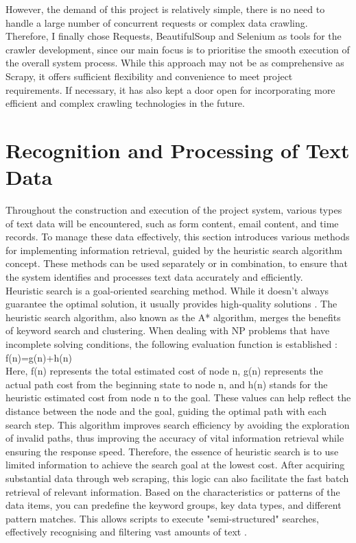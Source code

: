 \documentclass[ oneside,%
                    author={Cassie Qing Tang},
                    degree={BSc},
                     title={An Automated Response System for Disrupting Online Pet Scamming \\ },
                    subtitle={ }]{dissertation}
\begin{document}
However, the demand of this project is relatively simple, there is no need to handle a large number of concurrent requests or complex data crawling. Therefore, I finally chose Requests, BeautifulSoup and Selenium as tools for the crawler development, since our main focus is to prioritise the smooth execution of the overall system process. While this approach may not be as comprehensive as Scrapy, it offers sufficient flexibility and convenience to meet project requirements. If necessary, it has also kept a door open for incorporating more efficient and complex crawling technologies in the future.


\section{Recognition and Processing of Text Data}
Throughout the construction and execution of the project system, various types of text data will be encountered, such as form content, email content, and time records. To manage these data effectively, this section introduces various methods for implementing information retrieval, guided by the heuristic search algorithm concept. These methods can be used separately or in combination, to ensure that the system identifies and processes text data accurately and efficiently.
\\

Heuristic search is a goal-oriented searching method. While it doesn't always guarantee the optimal solution, it usually provides high-quality solutions \cite{a_chapter_2001}. The heuristic search algorithm, also known as the A* algorithm, merges the benefits of keyword search and clustering. When dealing with NP problems that have incomplete solving conditions, the following evaluation function is established \cite{zhao_information_2014}:
\\

f(n)=g(n)+h(n)
\\

Here, f(n) represents the total estimated cost of node n, g(n) represents the actual path cost from the beginning state to node n, and h(n) stands for the heuristic estimated cost from node n to the goal. These values can help reflect the distance between the node and the goal, guiding the optimal path with each search step. This algorithm improves search efficiency by avoiding the exploration of invalid paths, thus improving the accuracy of vital information retrieval while ensuring the response speed. Therefore, the essence of heuristic search is to use limited information to achieve the search goal at the lowest cost. After acquiring substantial data through web scraping, this logic can also facilitate the fast batch retrieval of relevant information. Based on the characteristics or patterns of the data items, you can predefine the keyword groups, key data types, and different pattern matches. This allows scripts to execute "semi-structured" searches, effectively recognising and filtering vast amounts of text \cite{manning_introduction_2009}.
\\
\end{document}

